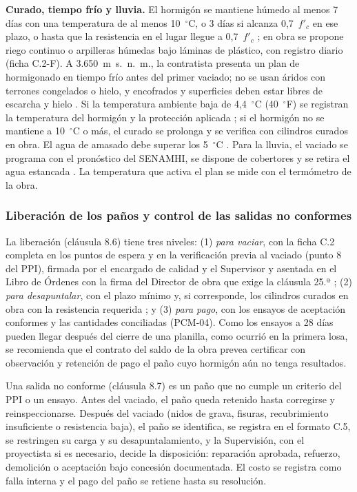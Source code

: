 \textbf{Curado, tiempo frío y lluvia.} El hormigón se mantiene húmedo al menos 7 días con una temperatura de al menos 10~$^{\circ}$C, o 3 días si alcanza 0,7~$f'_c$ en ese plazo, o hasta que la resistencia en el lugar llegue a 0,7~$f'_c$ \parencite[sección 26.5.3.2]{aci318_2025}; en obra se propone riego continuo o arpilleras húmedas bajo láminas de plástico, con registro diario (ficha C.2-F). A 3.650~m~s.~n.~m., la contratista presenta un plan de hormigonado en tiempo frío antes del primer vaciado; no se usan áridos con terrones congelados o hielo, y encofrados y superficies deben estar libres de escarcha y hielo \parencite[sección 26.5.4.2]{aci318_2025}. Si la temperatura ambiente baja de 4,4~$^{\circ}$C (40~$^{\circ}$F) se registran la temperatura del hormigón y la protección aplicada \parencite[sección 26.13.2.2]{aci318_2025}; si el hormigón no se mantiene a 10~$^{\circ}$C o más, el curado se prolonga y se verifica con cilindros curados en obra. El agua de amasado debe superar los 5~$^{\circ}$C \parencite[p.~2]{uatf_et}. Para la lluvia, el vaciado se programa con el pronóstico del SENAMHI, se dispone de cobertores y se retira el agua estancada \parencite[sección 26.5.2.2]{aci318_2025}. La temperatura que activa el plan se mide con el termómetro de la obra.

\subsubsection{Liberación de los paños y control de las salidas no conformes} La liberación (cláusula 8.6) tiene tres niveles: (1) \emph{para vaciar}, con la ficha C.2 completa en los puntos de espera y en la verificación previa al vaciado (punto 8 del PPI), firmada por el encargado de calidad y el Supervisor y asentada en el Libro de Órdenes con la firma del Director de obra que exige la cláusula 25.ª \parencite[p.~100]{uatf2025pao2}; (2) \emph{para desapuntalar}, con el plazo mínimo y, si corresponde, los cilindros curados en obra con la resistencia requerida \parencite[sección 26.12.4.1]{aci318_2025}; y (3) \emph{para pago}, con los ensayos de aceptación conformes y las cantidades conciliadas (PCM-04). Como los ensayos a 28 días pueden llegar después del cierre de una planilla, como ocurrió en la primera losa, se recomienda que el contrato del saldo de la obra prevea certificar con observación y retención de pago el paño cuyo hormigón aún no tenga resultados.

Una salida no conforme (cláusula 8.7) es un paño que no cumple un criterio del PPI o un ensayo. Antes del vaciado, el paño queda retenido hasta corregirse y reinspeccionarse. Después del vaciado (nidos de grava, fisuras, recubrimiento insuficiente o resistencia baja), el paño se identifica, se registra en el formato C.5, se restringen su carga y su desapuntalamiento, y la Supervisión, con el proyectista si es necesario, decide la disposición: reparación aprobada, refuerzo, demolición o aceptación bajo concesión documentada. El costo se registra como falla interna y el pago del paño se retiene hasta su resolución.

